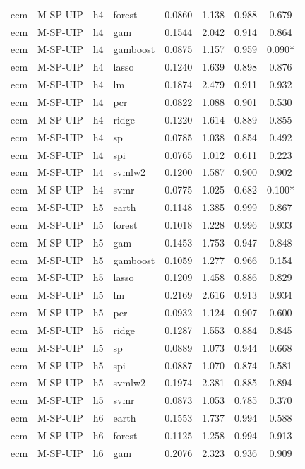 \begin{ThreePartTable}
\begin{longtable}[t]{llclcccc}
ecm & M-SP-UIP & h4 & forest & 0.0860 & 1.138 & 0.988 & 0.679\\
ecm & M-SP-UIP & h4 & gam & 0.1544 & 2.042 & 0.914 & 0.864\\
ecm & M-SP-UIP & h4 & gamboost & 0.0875 & 1.157 & 0.959 & 0.090*\\
ecm & M-SP-UIP & h4 & lasso & 0.1240 & 1.639 & 0.898 & 0.876\\
ecm & M-SP-UIP & h4 & lm & 0.1874 & 2.479 & 0.911 & 0.932\\
ecm & M-SP-UIP & h4 & pcr & 0.0822 & 1.088 & 0.901 & 0.530\\
ecm & M-SP-UIP & h4 & ridge & 0.1220 & 1.614 & 0.889 & 0.855\\
ecm & M-SP-UIP & h4 & sp & 0.0785 & 1.038 & 0.854 & 0.492\\
ecm & M-SP-UIP & h4 & spi & 0.0765 & 1.012 & 0.611 & 0.223\\
ecm & M-SP-UIP & h4 & svmlw2 & 0.1200 & 1.587 & 0.900 & 0.902\\
ecm & M-SP-UIP & h4 & svmr & 0.0775 & 1.025 & 0.682 & 0.100*\\
\addlinespace
ecm & M-SP-UIP & h5 & earth & 0.1148 & 1.385 & 0.999 & 0.867\\
ecm & M-SP-UIP & h5 & forest & 0.1018 & 1.228 & 0.996 & 0.933\\
ecm & M-SP-UIP & h5 & gam & 0.1453 & 1.753 & 0.947 & 0.848\\
ecm & M-SP-UIP & h5 & gamboost & 0.1059 & 1.277 & 0.966 & 0.154\\
ecm & M-SP-UIP & h5 & lasso & 0.1209 & 1.458 & 0.886 & 0.829\\
ecm & M-SP-UIP & h5 & lm & 0.2169 & 2.616 & 0.913 & 0.934\\
ecm & M-SP-UIP & h5 & pcr & 0.0932 & 1.124 & 0.907 & 0.600\\
ecm & M-SP-UIP & h5 & ridge & 0.1287 & 1.553 & 0.884 & 0.845\\
ecm & M-SP-UIP & h5 & sp & 0.0889 & 1.073 & 0.944 & 0.668\\
ecm & M-SP-UIP & h5 & spi & 0.0887 & 1.070 & 0.874 & 0.581\\
ecm & M-SP-UIP & h5 & svmlw2 & 0.1974 & 2.381 & 0.885 & 0.894\\
ecm & M-SP-UIP & h5 & svmr & 0.0873 & 1.053 & 0.785 & 0.370\\
\addlinespace
ecm & M-SP-UIP & h6 & earth & 0.1553 & 1.737 & 0.994 & 0.588\\
ecm & M-SP-UIP & h6 & forest & 0.1125 & 1.258 & 0.994 & 0.913\\
ecm & M-SP-UIP & h6 & gam & 0.2076 & 2.323 & 0.936 & 0.909\\

\end{longtable}
\end{ThreePartTable}
